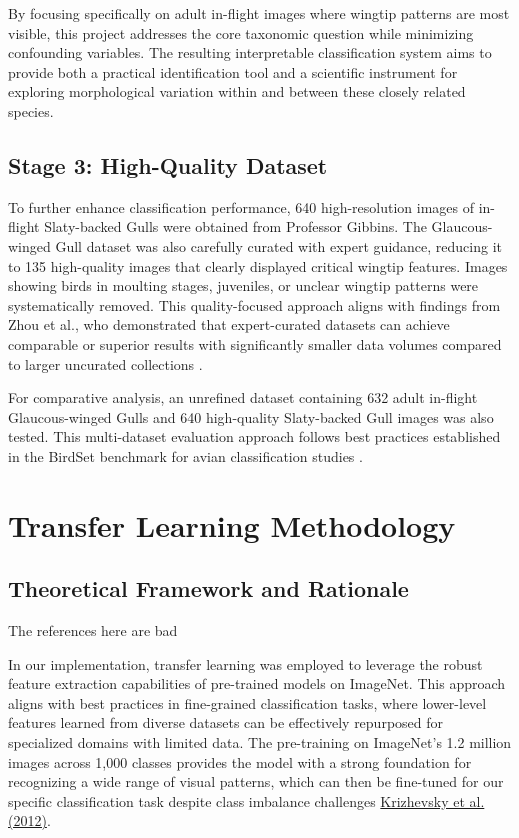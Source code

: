 \documentclass[a4paper,12pt]{article}
\begin{document}
By focusing specifically on adult in-flight images where wingtip patterns are most visible, this project addresses the core taxonomic question while minimizing confounding variables. The resulting interpretable classification system aims to provide both a practical identification tool and a scientific instrument for exploring morphological variation within and between these closely related species.

\subsection{Stage 3: High-Quality Dataset}

To further enhance classification performance, 640 high-resolution images of in-flight Slaty-backed Gulls were obtained from Professor Gibbins. The Glaucous-winged Gull dataset was also carefully curated with expert guidance, reducing it to 135 high-quality images that clearly displayed critical wingtip features. Images showing birds in moulting stages, juveniles, or unclear wingtip patterns were systematically removed. This quality-focused approach aligns with findings from Zhou et al., who demonstrated that expert-curated datasets can achieve comparable or superior results with significantly smaller data volumes compared to larger uncurated collections \citet{zhou2022}.

For comparative analysis, an unrefined dataset containing 632 adult in-flight Glaucous-winged Gulls and 640 high-quality Slaty-backed Gull images was also tested. This multi-dataset evaluation approach follows best practices established in the BirdSet benchmark for avian classification studies \citet{birdset2023}.
\section{Transfer Learning Methodology}

\subsection{Theoretical Framework and Rationale} The references here are bad


In our implementation, transfer learning was employed to leverage the robust feature extraction capabilities of pre-trained models on ImageNet. This approach aligns with best practices in fine-grained classification tasks, where lower-level features learned from diverse datasets can be effectively repurposed for specialized domains with limited data. The pre-training on ImageNet's 1.2 million images across 1,000 classes provides the model with a strong foundation for recognizing a wide range of visual patterns, which can then be fine-tuned for our specific classification task despite class imbalance challenges \href{https://proceedings.neurips.cc/paper/2012/file/c399862d3b9d6b76c8436e924a68c45b-Paper.pdf}{Krizhevsky et al. (2012)}.
\end{document}
